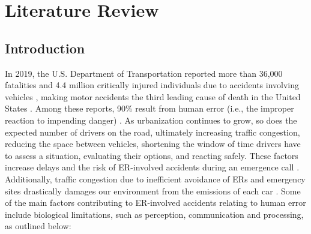 \chapter{Literature Review}

\section{Introduction}

In 2019, the U.S. Department of Transportation reported more than 36,000 fatalities and 4.4 million critically injured individuals due to accidents involving vehicles \cite{Vehicle-Fatalities2020}, making motor accidents the third leading cause of death in the United States \cite{Leading-Causes-Death2021}. Among these reports, 90\% result from human error (i.e., the improper reaction to impending danger) \cite{Canada-Driving-Stats2021}. As urbanization continues to grow, so does the expected number of drivers on the road, ultimately increasing traffic congestion, reducing the space between vehicles, shortening the window of time drivers have to assess a situation, evaluating their options, and reacting safely. These factors increase delays and the risk of ER-involved accidents during an emergence call \cite{Vehicles-on-Road2020}. Additionally, traffic congestion due to inefficient avoidance of \acrshort{ER}s and emergency sites drastically damages our environment from the emissions of each car \cite{Idling-Impacts2016, Drop2021}.
Some of the main factors contributing to \acrshort{ER}-involved accidents relating to human error include biological limitations, such as perception, communication and processing, as outlined below:

